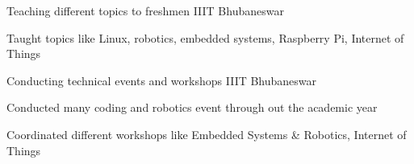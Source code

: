 \begin{cventries}
  \cventry
    {}
    {Teaching different topics to freshmen}
    {IIIT Bhubaneswar}
    {}
    {
      \vspace{-8mm}
      \begin{cvitems}
        \item {Taught topics like Linux, robotics, embedded systems, Raspberry Pi, Internet of Things
        \vspace{-6mm}}
      \end{cvitems}
    }
  \cventry
    {}
    {Conducting technical events and workshops}
    {IIIT Bhubaneswar}
    {}
    {
      \vspace{-5mm}
      \begin{cvitems}
        \item {Conducted many coding and robotics event through out the academic year}
        \item {Coordinated different workshops like Embedded Systems \& Robotics, Internet of Things
        \vspace{-6mm}}
      \end{cvitems}
    }
\end{cventries}
